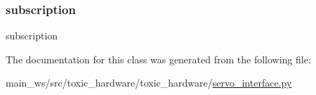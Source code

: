 \subsubsection{\texorpdfstring{subscription}{subscription}}
{\footnotesize\ttfamily subscription}



The documentation for this class was generated from the following file\+:\begin{DoxyCompactItemize}
\item 
main\+\_\+ws/src/toxic\+\_\+hardware/toxic\+\_\+hardware/\mbox{\hyperlink{servo__interface_8py}{servo\+\_\+interface.\+py}}\end{DoxyCompactItemize}

